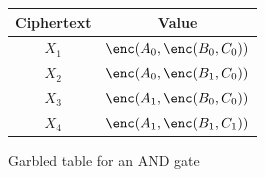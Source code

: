 \begin{figure}[ht]
    \centering
    \begin{minipage}[c][4cm][b]{0.6\linewidth}
        \centering

        \begin{tabular}{cc}
            \toprule
            Ciphertext & Value\\
            \midrule
            $X_1$ & $\enc(A_0, \enc(B_0, C_0))$\\
            $X_2$ & $\enc(A_0, \enc(B_1, C_0))$\\
            $X_3$ & $\enc(A_1, \enc(B_0, C_0))$\\
            $X_4$ & $\enc(A_1, \enc(B_1, C_1))$\\
            \bottomrule
        \end{tabular}

        \vspace{0.4cm}
    \end{minipage}

    \caption{Garbled table for an AND gate}
    \label{fig:garbled-and-gate}
\end{figure}